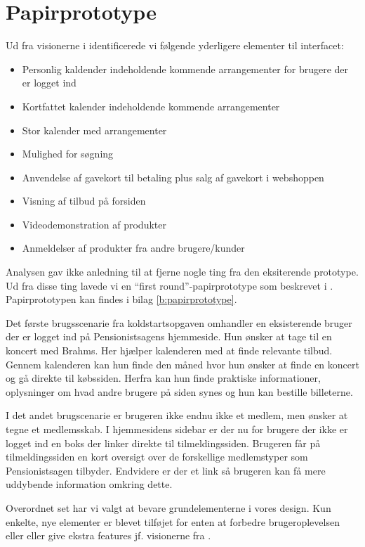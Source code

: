 \section{Papirprototype}

Ud fra visionerne i \cite{os} identificerede vi følgende yderligere
elementer til interfacet:

\begin{itemize}
    \item Personlig kaldender indeholdende kommende arrangementer for brugere
          der er logget ind
    \item Kortfattet kalender indeholdende kommende arrangementer
    \item Stor kalender med arrangementer
    \item Mulighed for søgning
    \item Anvendelse af gavekort til betaling plus salg af gavekort i webshoppen
    \item Visning af tilbud på forsiden
    \item Videodemonstration af produkter
    \item Anmeldelser af produkter fra andre brugere/kunder
\end{itemize}

Analysen gav ikke anledning til at fjerne nogle ting fra den eksiterende
prototype. Ud fra disse ting lavede vi en ``first round''-papirprototype
som beskrevet i \cite{Holtzblatt2005}. Papirprototypen kan findes i bilag
\ref{b:papirprototype}.

Det første brugsscenarie fra koldstartsopgaven omhandler en eksisterende
bruger der er logget ind på Pensionistsagens hjemmeside. Hun ønsker at tage
til en koncert med Brahms. Her hjælper kalenderen med at finde relevante
tilbud. Gennem kalenderen kan hun finde den måned hvor hun ønsker at finde
en koncert og gå direkte til købssiden. Herfra kan hun finde praktiske
informationer, oplysninger om hvad andre brugere på siden synes og hun kan
bestille billeterne.

I det andet brugscenarie er brugeren ikke endnu ikke et medlem, men ønsker at
tegne et medlemsskab. I hjemmesidens sidebar er der nu for brugere der ikke
er logget ind en boks der linker direkte til tilmeldingssiden. Brugeren får
på tilmeldingssiden en kort oversigt over de forskellige medlemstyper som
Pensionistsagen tilbyder. Endvidere er der et link så brugeren kan få mere
uddybende information omkring dette.

Overordnet set har vi valgt at bevare grundelementerne i vores design.
Kun enkelte, nye elementer er blevet tilføjet for enten at forbedre
brugeroplevelsen eller eller give ekstra features jf. visionerne fra
\cite{os}.
